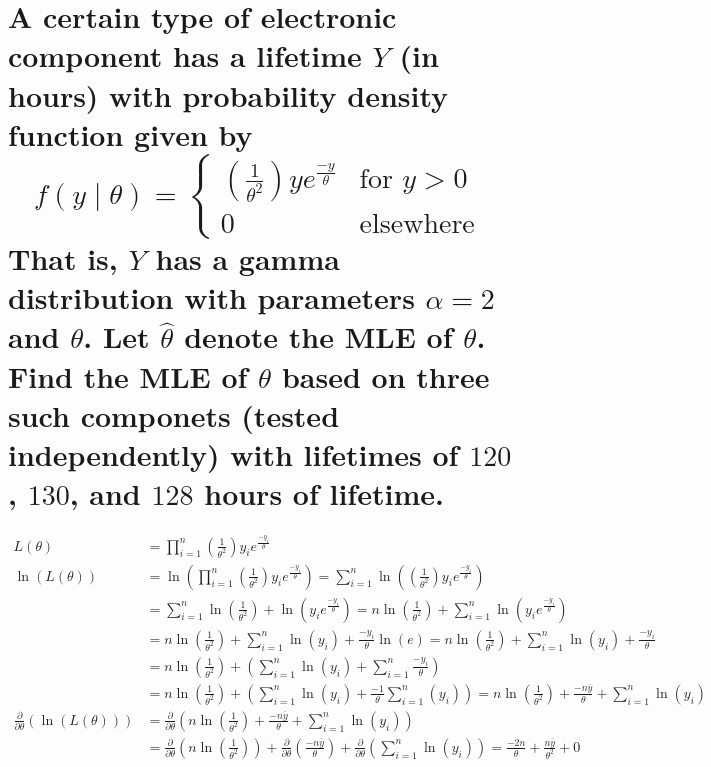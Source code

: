 \documentclass[10pt, letterpaper, titlepage]{article}
\newcommand{\my}{\overline{y}}
\begin{document}
    \newpage
    \section[]{A certain type of electronic component has a lifetime $Y$ (in hours) with probability density function given by
        \[
            f(y\mid \theta) =
            \begin{cases}
                (\frac{1}{\theta^2})ye^{\frac{-y}{\theta}} &\text{for } y > 0\\
                0 &\text{elsewhere}
            \end{cases}
        \]
        That is, $Y$ has a gamma distribution with parameters $\alpha = 2$ and $\theta$. Let $\hat\theta$ denote the
        MLE of $\theta$. Find the MLE of $\theta$ based on three such componets (tested independently) with lifetimes
        of $120$, $130$, and $128$ hours of lifetime.}
        \begin{align*}
            L(\theta) 
            &= \prod_{i=1}^n (\frac{1}{\theta^2})y_ie^{\frac{-y_i}{\theta}}\\
            \ln(L(\theta)) 
            &= \ln(\prod_{i=1}^n (\frac{1}{\theta^2})y_ie^{\frac{-y_i}{\theta}})
            = \sum_{i=1}^n \ln((\frac{1}{\theta^2})y_ie^{\frac{-y_i}{\theta}})\\
            &= \sum_{i=1}^n \ln(\frac{1}{\theta^2}) + \ln(y_ie^{\frac{-y_i}{\theta}})
            = n\ln(\frac{1}{\theta^2}) + \sum_{i=1}^n \ln(y_ie^{\frac{-y_i}{\theta}})\\
            &= n\ln(\frac{1}{\theta^2}) + \sum_{i=1}^n \ln(y_i) + \frac{-y_i}{\theta} \ln(e)
            = n\ln(\frac{1}{\theta^2}) + \sum_{i=1}^n \ln(y_i) + \frac{-y_i}{\theta}\\
            &= n\ln(\frac{1}{\theta^2}) + (\sum_{i=1}^n \ln(y_i) + \sum_{i=1}^n \frac{-y_i}{\theta})\\
            &= n\ln(\frac{1}{\theta^2}) + (\sum_{i=1}^n \ln(y_i) + \frac{-1}{\theta}\sum_{i=1}^n (y_i))
            = n\ln(\frac{1}{\theta^2}) + \frac{-n\my}{\theta} + \sum_{i=1}^n \ln(y_i)\\
            \frac{\partial}{\partial\theta}(\ln(L(\theta)))
            &=\frac{\partial}{\partial\theta}(n\ln(\frac{1}{\theta^2}) + \frac{-n\my}{\theta} + \sum_{i=1}^n \ln(y_i))\\
            &=\frac{\partial}{\partial\theta}(n\ln(\frac{1}{\theta^2}))
            +\frac{\partial}{\partial\theta}(\frac{-n\my}{\theta})
            +\frac{\partial}{\partial\theta}(\sum_{i=1}^n \ln(y_i))
            = \frac{-2n}{\theta} + \frac{n\my}{\theta^2}+0
        \end{align*}
\end{document}
